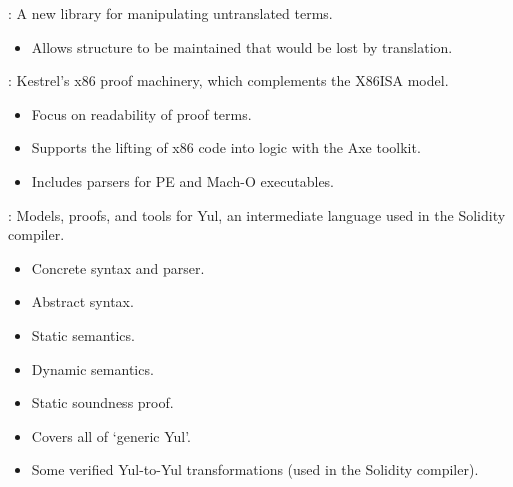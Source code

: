 
\begin{frame}

\newlibtitle

:
A new library for manipulating untranslated terms.
\begin{itemize}
\item Allows structure to be maintained that would be lost by translation.
\end{itemize}
\end{frame}


\begin{frame}

\newlibtitle

:
Kestrel's x86 proof machinery, which complements the X86ISA model.
\begin{itemize}
\item Focus on readability of proof terms.
\item Supports the lifting of x86 code into logic with the Axe toolkit.
\item Includes parsers for PE and Mach-O executables.
\end{itemize}
\end{frame}


\begin{frame}

\newlibtitle

:
Models, proofs, and tools for Yul,
an intermediate language used in the Solidity compiler.
\begin{itemize}
\item Concrete syntax and parser.
\item Abstract syntax.
\item Static semantics.
\item Dynamic semantics.
\item Static soundness proof.
\item Covers all of `generic Yul'.
\item Some verified Yul-to-Yul transformations (used in the Solidity compiler).
\end{itemize}

\end{frame}

